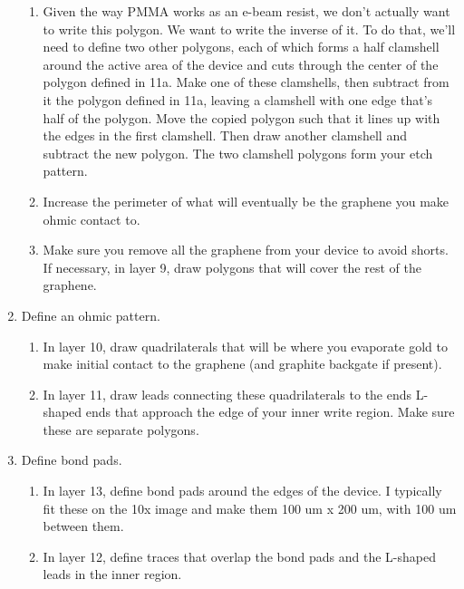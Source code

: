 \begin{appendices}
\begin{enumerate}
\begin{enumerate}
		\item Given the way PMMA works as an e-beam resist, we don’t actually want to write this polygon. We want to write the inverse of it. To do that, we’ll need to define two other polygons, each of which forms a half clamshell around the active area of the device and cuts through the center of the polygon defined in 11a. Make one of these clamshells, then subtract from it the polygon defined in 11a, leaving a clamshell with one edge that’s half of the polygon. Move the copied polygon such that it lines up with the edges in the first clamshell. Then draw another clamshell and subtract the new polygon. The two clamshell polygons form your etch pattern.
		\item Increase the perimeter of what will eventually be the graphene you make ohmic contact to. 
		\item Make sure you remove all the graphene from your device to avoid shorts. If necessary, in layer 9, draw polygons that will cover the rest of the graphene.
	\end{enumerate}
	\item Define an ohmic pattern.
	\begin{enumerate}
		\item In layer 10, draw quadrilaterals that will be where you evaporate gold to make initial contact to the graphene (and graphite backgate if present).
		\item In layer 11, draw leads connecting these quadrilaterals to the ends L-shaped ends that approach the edge of your inner write region. Make sure these are separate polygons.
	\end{enumerate}
	\item Define bond pads.
	\begin{enumerate}
		\item In layer 13, define bond pads around the edges of the device. I typically fit these on the 10x image and make them 100 um x 200 um, with 100 um between them.
		\item In layer 12, define traces that overlap the bond pads and the L-shaped leads in the inner region.
	\end{enumerate}
\end{enumerate}


\end{appendices}
